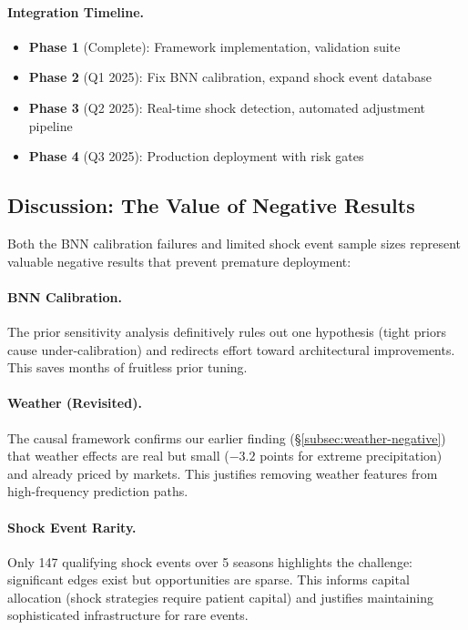 \paragraph{Integration Timeline.}
\begin{itemize}
  \item \textbf{Phase 1} (Complete): Framework implementation, validation suite
  \item \textbf{Phase 2} (Q1 2025): Fix BNN calibration, expand shock event database
  \item \textbf{Phase 3} (Q2 2025): Real-time shock detection, automated adjustment pipeline
  \item \textbf{Phase 4} (Q3 2025): Production deployment with risk gates
\end{itemize}

\subsection{Discussion: The Value of Negative Results}

Both the BNN calibration failures and limited shock event sample sizes represent valuable negative results that prevent premature deployment:

\paragraph{BNN Calibration.}
The prior sensitivity analysis definitively rules out one hypothesis (tight priors cause under-calibration) and redirects effort toward architectural improvements. This saves months of fruitless prior tuning.

\paragraph{Weather (Revisited).}
The causal framework confirms our earlier finding (\S\ref{subsec:weather-negative}) that weather effects are real but small ($-3.2$ points for extreme precipitation) and already priced by markets. This justifies removing weather features from high-frequency prediction paths.

\paragraph{Shock Event Rarity.}
Only 147 qualifying shock events over 5 seasons highlights the challenge: significant edges exist but opportunities are sparse. This informs capital allocation (shock strategies require patient capital) and justifies maintaining sophisticated infrastructure for rare events.

